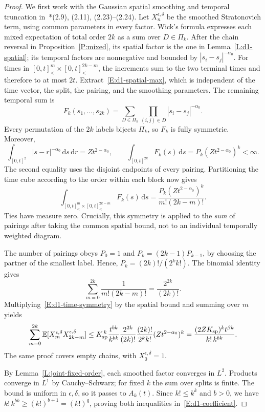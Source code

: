 \documentclass[12pt]{article}
\numberwithin{equation}{section}
\theoremstyle{definition}
\newcommand{\E}{\mathbb{E}}
\newcommand{\ud}{\,\mathrm{d}}
\begin{document}
\begin{proof}
  We first work with the Gaussian spatial smoothing and temporal
  truncation in~\cite{chen:author2026:time-dependency}*{(2.9), (2.11),
  (2.23)--(2.24)}.
  Let $X_n^{\epsilon,\delta}$ be the smoothed Stratonovich term, using
  common parameters in every factor. Wick's formula expresses each
  mixed expectation of total order $2k$ as a sum over $D\in\Pi_k$.
  After the chain reversal in Proposition~\ref{P:mixed}, its spatial
  factor is the one in Lemma~\ref{L:d1-spatial}; its temporal factors
  are nonnegative and bounded by $|s_i-s_j|^{-\alpha_0}$. For times
  in $[0,t]^m_<\times[0,t]^{2k-m}_<$, the increments sum to the two
  terminal times and therefore to at most $2t$.
  Extract~\eqref{E:d1-spatial-max}, which is independent of the
  time vector, the split, the pairing, and the smoothing parameters.
  The remaining temporal sum is
  \[
    F_k(s_1,\ldots,s_{2k})
    =\sum_{D\in\Pi_k}\prod_{(i,j)\in D}|s_i-s_j|^{-\alpha_0}.
  \]
  Every permutation of the $2k$ labels bijects $\Pi_k$, so $F_k$ is
  fully symmetric. Moreover,
  \[
    \int_{[0,t]^2}|s-r|^{-\alpha_0}\ud s\ud r
    =Zt^{2-\alpha_0},\qquad
    \int_{[0,t]^{2k}}F_k(s)\ud s
    =P_k(Zt^{2-\alpha_0})^k<\infty.
  \]
  The second equality uses the disjoint endpoints of every pairing.
  Partitioning the time cube according to the order within each block
  now gives
  \begin{equation}\label{E:d1-time-symmetry}
    \int_{[0,t]^m_<\times[0,t]^{2k-m}_<}F_k(s)\ud s
    =\frac{P_k(Zt^{2-\alpha_0})^k}{m!(2k-m)!}.
  \end{equation}
  Ties have measure zero. Crucially, this symmetry is applied to the
  \emph{sum} of pairings after taking the common spatial bound, not
  to an individual temporally weighted diagram.

  The number of pairings obeys $P_0=1$ and
  $P_k=(2k-1)P_{k-1}$, by choosing the partner of the smallest label.
  Hence, $P_k=(2k)!/(2^kk!)$. The binomial identity gives
  \[
    \sum_{m=0}^{2k}\frac1{m!(2k-m)!}=\frac{2^{2k}}{(2k)!}.
  \]
  Multiplying~\eqref{E:d1-time-symmetry} by the spatial bound and
  summing over $m$ yields
  \[
    \sum_{m=0}^{2k}\E[X_m^{\epsilon,\delta}X_{2k-m}^{\epsilon,\delta}]
    \le K_{\rm sp}^{\,k}\frac{t^{bk}}{k^{bk}}
    \frac{2^{2k}}{(2k)!}
    \frac{(2k)!}{2^kk!}(Zt^{2-\alpha_0})^k
    =\frac{(2ZK_{\rm sp})^kt^{\beta k}}{k!\,k^{bk}}.
  \]
  The same proof covers empty chains, with $X_0^{\epsilon,\delta}=1$.

  By Lemma~\ref{L:joint-fixed-order}, each smoothed factor converges
  in $L^2$.
  Products converge in $L^1$ by Cauchy--Schwarz; for fixed $k$ the sum
  over splits is finite. The bound is uniform in $\epsilon,\delta$,
  so it passes to $A_k(t)$. Since $k!\le k^k$ and $b>0$, we have
  $k!\,k^{bk}\ge(k!)^{b+1}=(k!)^q$, proving both inequalities
  in~\eqref{E:d1-coefficient}.


\end{proof}
\end{document}
